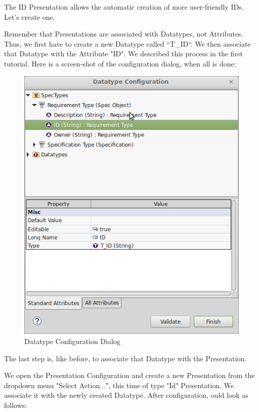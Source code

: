 The ID Presentation allows the automatic creation of more user-friendly IDs.  Let's create one.

Remember that Presentations are associated with Datatypes, not Attributes.  Thus, we first have to create a new Datatype called ``T\_ID``.  We then associate that Datatype with the Attribute "ID".  We described this process in the first tutorial.  Here is a screen-shot of the configuration dialog, when all is done:

\begin{figure}[h!]
\centering      
\includegraphics[width=0.8\linewidth]{../rmf-images/t_id.png}      
\caption{Datatype Configuration Dialog}      
\label{fig:datatypeConfig}
\end{figure}

The last step is, like before, to associate that Datatype with the Presentation.

We open the Presentation Configuration and create a new Presentation from the dropdown menu "Select Action...", this time of type "Id" Presentation.  We associate it with the newly created Datatype.  After configuration, ould look as follows:

